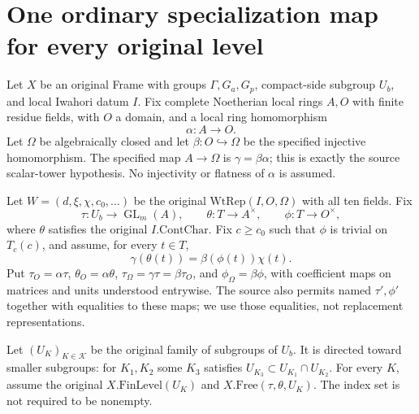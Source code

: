 \section{One ordinary specialization map for every original level}
\label{sec:specialization-map-v42}


Let $X$ be an original Frame with groups
$\Gamma,G_a,G_p$, compact-side subgroup $U_b$, and local
Iwahori datum $I$.  Fix complete Noetherian local rings
$A,O$ with finite residue fields, with $O$ a domain,
and a local ring homomorphism
\[
 \alpha:A\longrightarrow O.
\]
Let $\Omega$ be algebraically closed and let
$\beta:O\hookrightarrow\Omega$ be the specified injective
homomorphism.  The specified map $A\to\Omega$ is
$\gamma=\beta\alpha$; this is exactly the source scalar-tower
hypothesis.  No injectivity or flatness of $\alpha$ is assumed.

Let $W=(d,\xi,\chi,c_0,\ldots)$ be the original
$\mathrm{WtRep}(I,O,\Omega)$ with all ten fields.  Fix
\[
 \tau:U_b\longrightarrow\operatorname{GL}_m(A),\qquad
 \theta:T\longrightarrow A^\times,\qquad
 \phi:T\longrightarrow O^\times,
\]
where $\theta$ satisfies the original $I.\mathrm{ContChar}$.
Fix $c\geq c_0$ such that $\phi$ is trivial on $T_c(c)$,
and assume, for every $t\in T$,
\begin{equation}\label{eq:smp-character}
     \gamma(\theta(t))=\beta(\phi(t))\chi(t).
\end{equation}
Put $\tau_O=\alpha\tau$, $\theta_O=\alpha\theta$,
$\tau_\Omega=\gamma\tau=\beta\tau_O$, and
$\phi_\Omega=\beta\phi$, with coefficient maps on matrices
and units understood entrywise.  The source also permits
named $\tau',\phi'$ together with equalities to these maps;
we use those equalities, not replacement representations.

Let $(U_K)_{K\in\mathcal K}$ be the original family of
subgroups of $U_b$.  It is directed toward smaller subgroups:
for $K_1,K_2$ some $K_3$ satisfies
$U_{K_3}\subset U_{K_1}\cap U_{K_2}$.
For every $K$, assume the original
$X.\mathrm{FinLevel}(U_K)$ and
$X.\mathrm{Free}(\tau,\theta,U_K)$.
The index set is not required to be nonempty.

